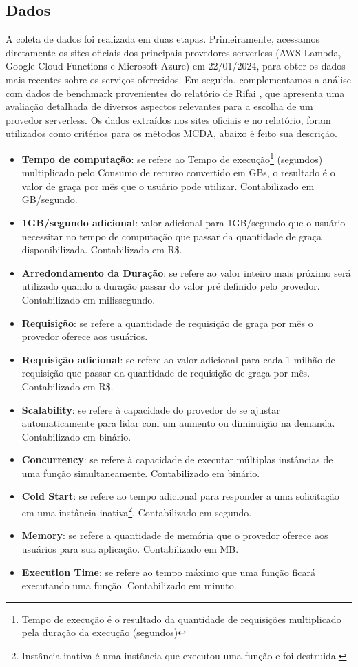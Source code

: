 \documentclass[12pt]{article}[abntex2]
\begin{document}
\subsection{Dados}
A coleta de dados foi realizada em duas etapas. Primeiramente, acessamos diretamente os sites oficiais dos principais provedores serverless (AWS Lambda, Google Cloud Functions e Microsoft Azure) em 22/01/2024, para obter os dados mais recentes sobre os serviços oferecidos. Em seguida, complementamos a análise com dados de benchmark provenientes do relatório de Rifai \cite{benchmarkMooner}, que apresenta uma avaliação detalhada de diversos aspectos relevantes para a escolha de um provedor serverless.
Os dados extraídos nos sites oficiais e no relatório, foram utilizados como critérios para os métodos MCDA, abaixo é feito sua descrição.
\begin{itemize}
    \item \textbf{Tempo de computação}: se refere ao Tempo de execução\footnote{Tempo de execução é o resultado da quantidade de requisições multiplicado pela duração da execução (segundos)} (segundos) multiplicado pelo Consumo de recurso convertido em GBs, o resultado é o valor de graça por mês que o usuário pode utilizar. Contabilizado em GB/segundo.
    \item \textbf{1GB/segundo adicional}: valor adicional para 1GB/segundo que o usuário necessitar no tempo de computação que passar da quantidade de graça disponibilizada. Contabilizado em R\$.
    \item \textbf{Arredondamento da Duração}: se refere ao valor inteiro mais próximo será utilizado quando a duração passar do valor pré definido pelo provedor. Contabilizado em milissegundo.
    \item \textbf{Requisição}: se refere a quantidade de requisição de graça por mês o provedor oferece aos usuários.
    \item \textbf{Requisição adicional}: se refere ao valor adicional para cada 1 milhão de requisição que passar da quantidade de requisição de graça por mês. Contabilizado em R\$. 
    \item \textbf{Scalability}: se refere à capacidade do provedor de se ajustar automaticamente para lidar com um aumento ou diminuição na demanda. Contabilizado em binário.
    \item \textbf{Concurrency}:  se refere à capacidade de executar múltiplas instâncias de uma função simultaneamente. Contabilizado em binário.
    \item \textbf{Cold Start}: se refere ao tempo adicional para responder a uma solicitação em uma instância inativa\footnote{Instância inativa é uma instância que executou uma função e foi destruida.}. Contabilizado em segundo.
    \item \textbf{Memory}: se refere a quantidade de memória que o provedor oferece aos usuários para sua aplicação. Contabilizado em MB.
    \item \textbf{Execution Time}: se refere ao tempo máximo que uma função ficará executando uma função. Contabilizado em minuto.
\end{itemize}
\end{document}
